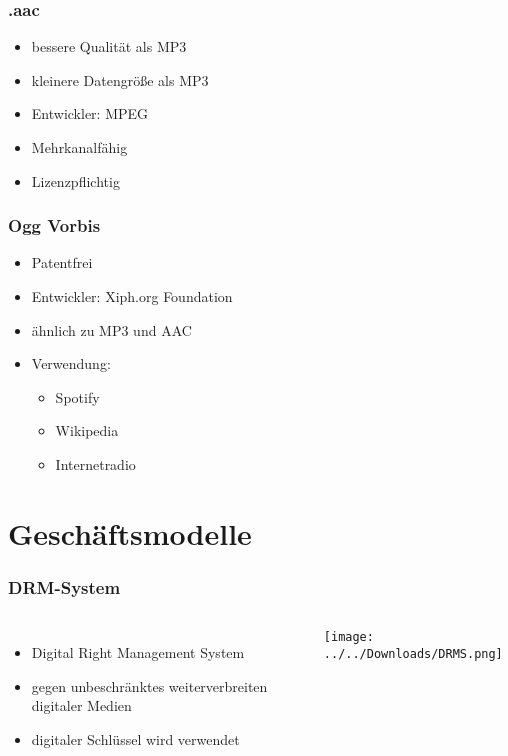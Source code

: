 \documentclass{beamer}
\begin{document}
\begin{frame}
\frametitle{.aac}
\begin{itemize}
	\Large	
	\item bessere Qualität als MP3
	\vspace{0.5cm}\item kleinere Datengröße als MP3
	\vspace{0.5cm}\item Entwickler: MPEG
	\vspace{0.5cm}\item Mehrkanalfähig
	\vspace{0.5cm}\item Lizenzpflichtig
\end{itemize}	
\end{frame}

\begin{frame}
\frametitle{Ogg Vorbis}
\begin{itemize}
	\Large	
	\item Patentfrei
	\vspace{0.5cm}\item Entwickler: Xiph.org Foundation
	\vspace{0.5cm}\item ähnlich zu MP3 und AAC
	\vspace{0.5cm}\item Verwendung:
	\begin{itemize}
		\item Spotify
		\item Wikipedia
		\item Internetradio
	\end{itemize}
\end{itemize}	
\end{frame}
\section{Geschäftsmodelle}


\begin{frame}
\frametitle{DRM-System}
\begin{columns}
	\begin{itemize}
		\Large	
		\item Digital Right Management System
		\vspace{0.5cm}\item gegen unbeschränktes weiterverbreiten digitaler Medien
		\vspace{0.5cm}\item digitaler Schlüssel wird verwendet
	\end{itemize}
	\texttt{[image: ../../Downloads/DRMS.png]} 
\end{columns}
\end{frame}
\end{document}
